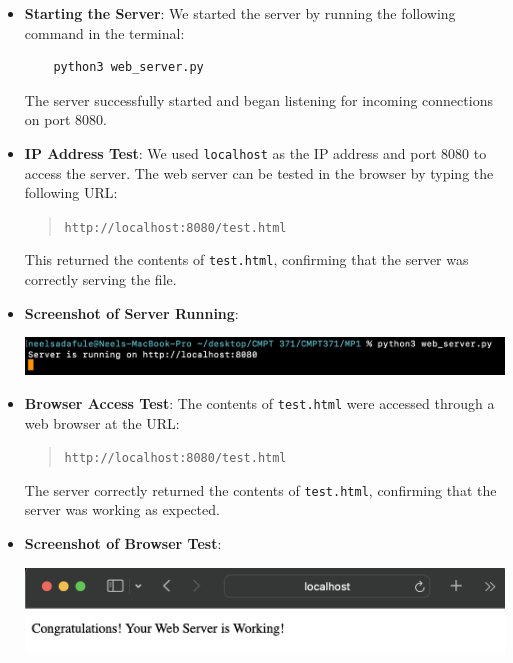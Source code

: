 \documentclass{article}
\begin{document}
\begin{itemize}
    \item \textbf{Starting the Server}:
    We started the server by running the following command in the terminal:
    \begin{lstlisting}
    python3 web_server.py
    \end{lstlisting}
    The server successfully started and began listening for incoming connections on port 8080.

    \item \textbf{IP Address Test}:
    We used \texttt{localhost} as the IP address and port 8080 to access the server. The web server can be tested in the browser by typing the following URL:
    \begin{quote}
        \texttt{http://localhost:8080/test.html}
    \end{quote}
    This returned the contents of \texttt{test.html}, confirming that the server was correctly serving the file.

    \item \textbf{Screenshot of Server Running}:
    \begin{center}
        \includegraphics[width=\textwidth]{screenshots/server_start.png}  
    \end{center}

    \item \textbf{Browser Access Test}: 
    The contents of \texttt{test.html} were accessed through a web browser at the URL:
    \begin{quote}
        \texttt{http://localhost:8080/test.html}
    \end{quote}
    The server correctly returned the contents of \texttt{test.html}, confirming that the server was working as expected.

    \item \textbf{Screenshot of Browser Test}:
    \begin{center}
        \includegraphics[width=\textwidth]{screenshots/browser_test.png}  %
    \end{center}
\end{itemize}
\end{document}
